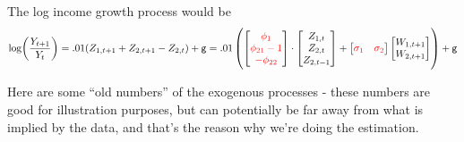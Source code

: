 \documentclass[12pt]{article}
\theoremstyle{definition}
\theoremstyle{remark}
\begin{document}
The log income growth process would be
\begin{equation*}
\log(\frac{Y_{t+1}}{Y_t}) = .01(Z_{1,t+1}+Z_{2,t+1}-Z_{2,t}) + {\sf g} = .01\left(\begin{bmatrix} \color{red}{\phi_1}\\ \color{red}{\phi_{21} -1}\\\color{red}{-\phi_{22}}\end{bmatrix}\cdot \begin{bmatrix} Z_{1,t}\\Z_{2,t}\\Z_{2,t-1}\end{bmatrix} + \begin{bmatrix}\color{red}{\sigma_1} & \color{red}{\sigma_2}\end{bmatrix} \begin{bmatrix}W_{1,t+1}\\W_{2,t+1} \end{bmatrix}\right) + {\sf g}
\end{equation*}

Here are some ``old numbers'' of the exogenous processes - these numbers are good for illustration purposes, but can potentially be far away from what is implied by the data, and that's the reason why we're doing the estimation.
\end{document}
